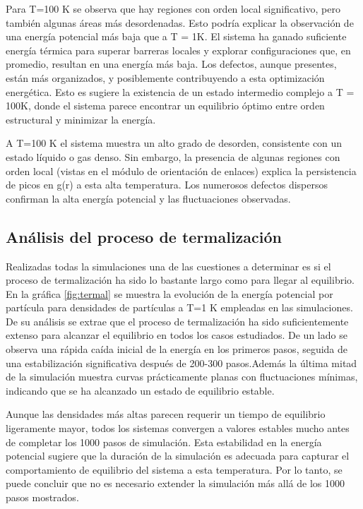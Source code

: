 Para T=100 K se observa que hay regiones con orden local significativo, pero también algunas áreas más desordenadas. Esto podría explicar la observación de una energía potencial más baja que a T = 1K. El sistema ha ganado suficiente energía térmica para superar barreras locales y explorar configuraciones que, en promedio, resultan en una energía más baja. Los defectos, aunque presentes, están más organizados,  y posiblemente contribuyendo a esta optimización energética. Esto es sugiere la existencia de un estado intermedio complejo a T = 100K, donde el sistema parece encontrar un equilibrio óptimo entre orden estructural y minimizar la energía.


\vspace{\baselineskip}


A T=100 K el sistema muestra un alto grado de desorden, consistente con un estado líquido o gas denso. Sin embargo, la presencia de algunas regiones con orden local (vistas en el módulo de orientación de enlaces) explica la persistencia de picos en g(r) a esta alta temperatura. Los numerosos defectos dispersos confirman la alta energía potencial y las fluctuaciones observadas.


\subsection{Análisis del proceso de termalización}

Realizadas todas la simulaciones una de las cuestiones a determinar es si el proceso de termalización ha sido lo bastante largo como para llegar al equilibrio. En la gráfica \ref{fig:termal} se muestra la  evolución de la energía potencial por partícula para densidades de partículas a T=1 K empleadas en las simulaciones. De su análisis  se extrae  que el proceso de termalización ha sido suficientemente extenso para alcanzar el equilibrio en todos los casos estudiados. De un lado se observa una rápida caída inicial de la energía en los primeros pasos, seguida de una estabilización significativa después de 200-300 pasos.Además la última mitad de la simulación muestra curvas prácticamente planas con fluctuaciones mínimas, indicando que se ha alcanzado un estado de equilibrio estable.

\vspace{\baselineskip}

Aunque las densidades más altas parecen requerir un tiempo de equilibrio ligeramente mayor, todos los sistemas convergen a valores estables mucho antes de completar los 1000 pasos de simulación. Esta estabilidad en la energía potencial sugiere que la duración de la simulación es adecuada para capturar el comportamiento de equilibrio del sistema a esta temperatura. Por lo tanto, se puede concluir que no es necesario extender la simulación más allá de los 1000 pasos mostrados.


